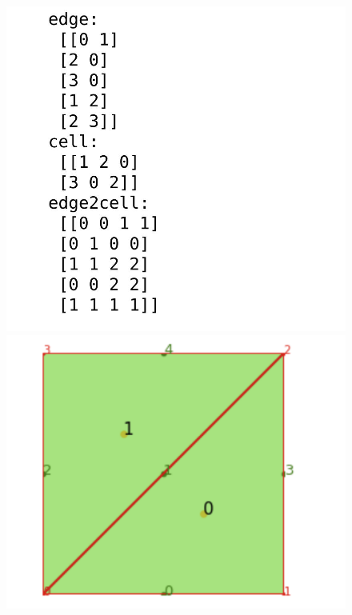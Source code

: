 \begin{figure}[htbp]
	\begin{minipage}[t]{0.35\linewidth}
		\centering
		\includegraphics[scale=0.5]{figures/fealpy/edge2cell-0}
		\caption{}
	\end{minipage}%
	\hfill
	\begin{minipage}[t]{0.5\linewidth}
		\centering
		\includegraphics[scale=0.5]{figures/fealpy/edge2cell-1}
		\caption{}
	\end{minipage}
\end{figure}

